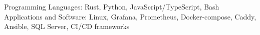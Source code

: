 
\begin{cvskills}
  \cvskill
    {Programming Languages:} %
    {Rust, Python, JavaScript/TypeScript, Bash} %
  \cvskill
    {Applications and Software:} %
    {Linux, Grafana, Prometheus, Docker-compose, Caddy, Ansible, SQL Server, CI/CD frameworks} %
\end{cvskills}
